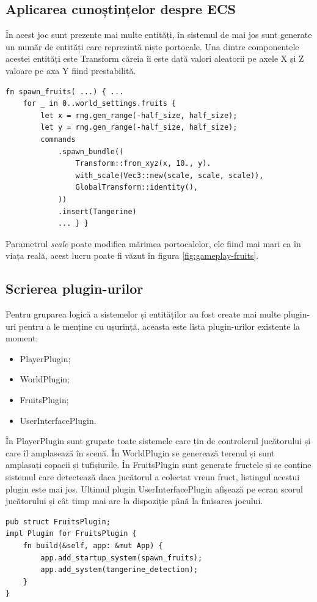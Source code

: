 \subsection{Aplicarea cunoștințelor despre ECS}
În acest joc sunt prezente mai multe entități, în sistemul de mai jos sunt
generate un număr de entități care reprezintă niște portocale. Una dintre componentele acestei entități este Transform căreia îi este dată valori aleatorii pe axele X și Z
valoare pe axa Y fiind prestabilită.
\begin{lstlisting}
fn spawn_fruits( ...) { ...
    for _ in 0..world_settings.fruits {
        let x = rng.gen_range(-half_size, half_size);
        let y = rng.gen_range(-half_size, half_size);
        commands
            .spawn_bundle((
                Transform::from_xyz(x, 10., y).
                with_scale(Vec3::new(scale, scale, scale)),
                GlobalTransform::identity(),
            ))
            .insert(Tangerine)
            ... } }
\end{lstlisting}
Parametrul \emph{scale} poate modifica mărimea portocalelor, ele fiind mai mari
ca în viața reală, acest lucru poate fi văzut în figura
\ref{fig:gameplay-fruits}.

\subsection{Scrierea plugin-urilor}
Pentru gruparea logică a sistemelor și entităților au fost create mai multe
plugin-uri pentru a le menține cu ușurință, aceasta este lista
plugin-urilor existente la moment:
\begin{itemize}
    \item PlayerPlugin;
    \item WorldPlugin;
    \item FruitsPlugin;
    \item UserInterfacePlugin.
\end{itemize}
În PlayerPlugin sunt grupate toate sistemele care țin de controlerul
jucătorului și care îl amplasează în scenă. În WorldPlugin se generează terenul
și sunt amplasați copacii și tufișiurile. În FruitsPlugin sunt generate
fructele și se conține sistemul care detectează daca jucătorul a colectat vreun
fruct, listingul acestui plugin este mai jos. Ultimul plugin
UserInterfacePlugin afișează pe ecran scorul jucătorului și cât timp mai are la
dispoziție până la finisarea jocului.
\begin{lstlisting}
pub struct FruitsPlugin;
impl Plugin for FruitsPlugin {
    fn build(&self, app: &mut App) {
        app.add_startup_system(spawn_fruits);
        app.add_system(tangerine_detection);
    }
}
\end{lstlisting}

